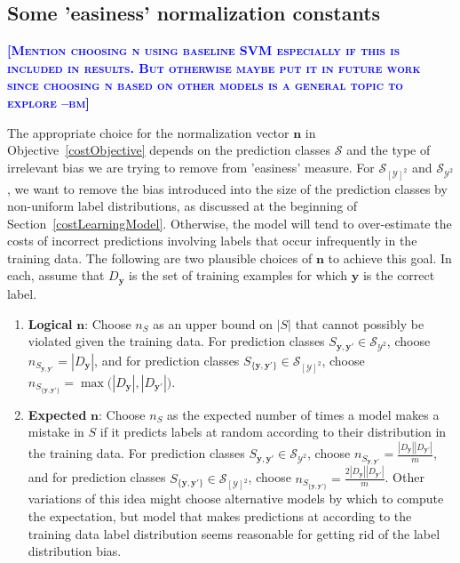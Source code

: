 \documentclass{article} %
\newcommand{\bmcomment}[1]{\textcolor{blue}{\textsc{\textbf{[#1 --bm]}}}}
\begin{document}
\subsection{Some 'easiness' normalization constants}

\bmcomment{Mention choosing n using baseline 
SVM especially if this is included in results.  But otherwise
maybe put it in future work since choosing n based on other
models is a general topic to explore}

The appropriate choice for the normalization vector $\mathbf{n}$ in 
Objective~\ref{costObjective} depends on the prediction classes
$\mathcal{S}$ and the type of irrelevant bias we are trying to
remove from 'easiness' measure. For $\mathcal{S}_{[\mathcal{Y}]^2}$
and $\mathcal{S}_{\mathcal{Y}^2}$, we want to remove the bias introduced
into the size of the prediction classes by non-uniform label 
distributions, as discussed at the beginning of 
Section~\ref{costLearningModel}.  Otherwise, the model will 
tend to over-estimate
the costs of incorrect predictions involving labels that occur 
infrequently in the training data.  The following are two 
plausible choices of $\mathbf{n}$ to achieve this goal. In each,
assume that $D_\mathbf{y}$ is the set of training examples
for which $\mathbf{y}$ is the correct label.

\begin{enumerate}

\item \textbf{Logical} $\mathbf{n}$: Choose $n_S$ as an upper bound
on $|S|$ that cannot possibly be violated given the training data. 
For prediction classes 
$S_{\mathbf{y},\mathbf{y'}}\in\mathcal{S}_{\mathcal{Y}^2}$, 
choose $n_{S_{\mathbf{y},\mathbf{y'}}}=|D_\mathbf{y}|$, and for prediction 
classes 
$S_{\{\mathbf{y},\mathbf{y'}\}}\in\mathcal{S}_{[\mathcal{Y}]^2}$,
choose 
$n_{S_{\{\mathbf{y},\mathbf{y'}\}}}=
\max\big(|D_\mathbf{y}|,|D_\mathbf{y'}|\big)$.

\item \textbf{Expected} $\mathbf{n}$:  Choose $n_S$ as the expected
number of times a model makes a mistake in $S$ if it predicts labels
at random according to their distribution in the training data. 
For prediction classes 
$S_{\mathbf{y},\mathbf{y'}}\in\mathcal{S}_{\mathcal{Y}^2}$, 
choose $n_{S_{\mathbf{y},\mathbf{y'}}}=
\frac{|D_\mathbf{y}||D_\mathbf{y'}|}{m}$, 
and for prediction classes 
$S_{\{\mathbf{y},\mathbf{y'}\}}\in\mathcal{S}_{[\mathcal{Y}]^2}$,
choose 
$n_{S_{\{\mathbf{y},\mathbf{y'}\}}}=
\frac{2|D_\mathbf{y}||D_\mathbf{y'}|}{m}$.
Other variations of this idea might choose alternative models by which
to compute the expectation, but model that makes predictions at
according to the training data label distribution seems 
reasonable for getting rid of the label distribution bias.

\end{enumerate}
\end{document}
